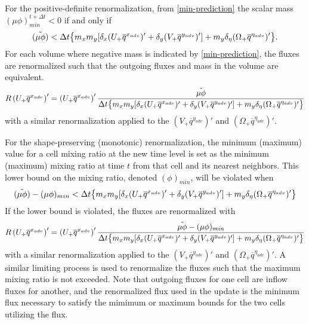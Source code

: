 For the positive-definite renormalization, from \eqref{min-prediction}
the scalar mass $(\mu\phi)_{min}^{t+\Delta t} < 0$ if and only if
%
\begin{equation}
(\tilde{\mu\phi}) < 
{\Delta t} \bigl\{
m_x m_y [\delta_x (U_+ \overline{q}^{x_{adv}})' 
+ \delta_y (V_+\overline{q}^{y_{adv}})'] 
+ m_y \delta_\eta
(\Omega_+ \overline{q}^{\eta_{adv}})'\bigr\}.
\notag
\end{equation}
%
For each volume where negative mass is indicated by
\eqref{min-prediction}, the fluxes are renormalized
such that the outgoing fluxes and mass in the volume are equivalent.
%
\begin{equation}
R\left(U_+\overline{q}^{x_{adv}}\right)' = 
\left(U_+\overline{q}^{x_{adv}}\right)' 
{ \tilde{\mu \phi} \over
{\Delta t} \bigl\{
m_x m_y [\delta_x (U_+ \overline{q}^{x_{adv}})' 
+ \delta_y (V_+\overline{q}^{y_{adv}})'] 
+ m_y \delta_\eta
(\Omega_+ \overline{q}^{\eta_{adv}})'\bigr\} }
\notag %
\end{equation}
%
with a similar renormalization applied to the 
$(V_+ \overline{q}^{y_{adv}})'$ 
and $(\Omega_+ \overline{q}^{\eta_{adv}})'$.


For the shape-preserving (monotonic) renormalization, the minimum (maximum) value
for a cell mixing ratio at the new time level is set as the minimum (maximum) mixing ratio at time $t$ from that 
cell and its nearest neighbors.  This lower bound on the mixing ratio, 
denoted $(\phi)_{min}$, will be violated when
%
\begin{equation}
(\tilde{\mu\phi}) - (\mu \phi)_{min} < 
{\Delta t} \bigl\{
m_x m_y [\delta_x (U_+ \overline{q}^{x_{adv}})' 
+ \delta_y (V_+\overline{q}^{y_{adv}})'] 
+ m_y \delta_\eta
(\Omega_+ \overline{q}^{\eta_{adv}})'\bigr\}
\notag
\end{equation}
%
If the lower bound is violated,
the fluxes are renormalized with
%
\begin{equation}
R\left(U_+\overline{q}^{x_{adv}}\right)' = 
\left(U_+\overline{q}^{x_{adv}}\right)' 
{ \tilde{\mu \phi} - (\mu \phi)_{min}\over
{\Delta t} \bigl\{
m_x m_y [\delta_x (U_+ \overline{q}^{x_{adv}})' 
+ \delta_y (V_+\overline{q}^{y_{adv}})'] 
+ m_y \delta_\eta
(\Omega_+ \overline{q}^{\eta_{adv}})'\bigr\} }
\notag %
\end{equation}
%
with a similar renormalization applied to the 
$(V_+ \overline{q}^{y_{adv}})'$ 
and $(\Omega_+ \overline{q}^{\eta_{adv}})'$.
A similar limiting process is used to renormalize the fluxes such that the maximum mixing ratio is not exceeded.  
Note that outgoing fluxes for one cell are inflow fluxes for another, and the renormalized flux used in the update is the minimum flux necessary to satisfy the mimimum or maximum bounds for the two cells utilizing the flux.

